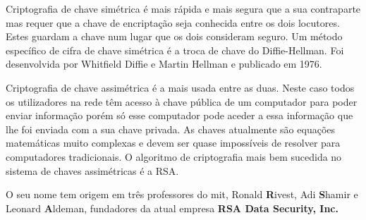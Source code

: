 \documentclass{report}
\begin{document}
	Criptografia de chave simétrica é mais rápida e mais segura que a sua contraparte mas requer que a chave de encriptação seja conhecida entre os dois locutores. Estes guardam a chave num lugar que os dois consideram seguro. Um método específico de cifra de chave simétrica é a troca de chave do Diffie-Hellman. Foi desenvolvida por Whitfield Diffie e Martin Hellman e publicado em 1976.
	
	Criptografia de chave assimétrica é a mais usada entre as duas. Neste caso todos os utilizadores na rede têm acesso à chave pública de um computador para poder enviar informação porém só esse computador pode aceder a essa informação que lhe foi enviada com a sua chave privada. As chaves atualmente são equações matemáticas muito complexas e devem ser quase impossíveis de resolver para computadores tradicionais. O algoritmo de criptografia mais bem sucedida no sistema de chaves assimétricas é a RSA.
	
	\newpage
	
	 O seu nome tem origem em três professores do \ac{mit}, Ronald \textbf{R}ivest,  Adi \textbf{S}hamir e Leonard \textbf{A}ldeman, fundadores da atual empresa \textbf{RSA Data Security, Inc.}
\end{document}

